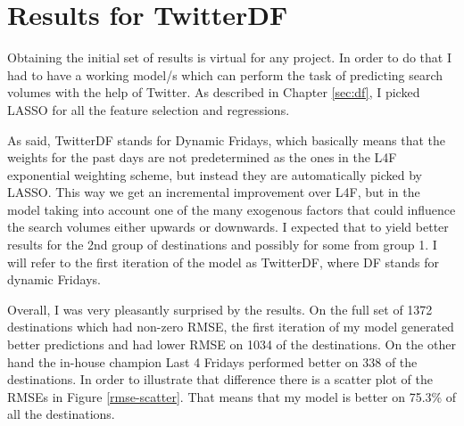 \documentclass[minf,twoside,singlespacing,parskip,frontabs]{infthesis}
\begin{document}
\newpage
\section{Results for TwitterDF}
\label{TwitterDF}


Obtaining the initial set of results is virtual for any project. In order to do that I had to have a working model/s which can perform the task of predicting search volumes with the help of Twitter. As described in Chapter \ref{sec:df}, I picked LASSO for all the feature selection and regressions. 


As said, TwitterDF stands for Dynamic Fridays, which basically means that the weights for the past days are not predetermined as the ones in the L4F exponential weighting scheme, but instead they are automatically picked by LASSO. This way we get an incremental improvement over L4F, but in the model taking into account one of the many exogenous factors that could influence the search volumes either upwards or downwards. I expected that to yield better results for the 2nd group of destinations and possibly for some from group 1. I will refer to the first iteration of the model as TwitterDF, where DF stands for dynamic Fridays. 


Overall, I was very pleasantly surprised by the results. On the full set of 1372 destinations which had non-zero RMSE, the first iteration of my model generated better predictions and had lower RMSE on 1034 of the destinations. On the other hand the in-house champion Last 4 Fridays performed better on 338 of the destinations. In order to illustrate that difference there is a scatter plot of the RMSEs in Figure \ref{rmse-scatter}. That means that my model is better on 75.3\% of all the destinations.
\end{document}
